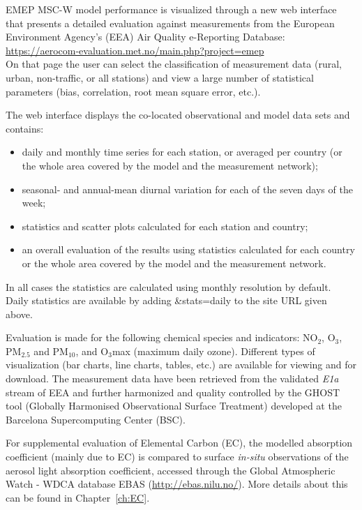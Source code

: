 EMEP MSC-W model performance is visualized through a new web
interface that presents a detailed evaluation against measurements from
the European Environment Agency's (EEA) Air Quality e-Reporting Database:\\
\url{https://aerocom-evaluation.met.no/main.php?project=emep}\\
On that page the user can select the classification of measurement data
(rural, urban, non-traffic, or all stations) and view a large number of
statistical parameters (bias, correlation, root mean square error, etc.).

The web interface displays the co-located observational and model data sets
and contains:
\begin{itemize}

\item daily and monthly time series for each station, or averaged per
  country (or the whole area covered by the model and the measurement network);
\item seasonal- and annual-mean diurnal variation for each of the seven days of the week;
\item statistics and scatter plots calculated for each station and country;
\item an overall evaluation of the results using statistics calculated for
  each country or the whole area covered by the model and the measurement network.
\end{itemize}
In all cases the statistics are calculated using monthly resolution
by default. Daily statistics are available by adding \&stats=daily to the
site URL given above.

Evaluation is made for the following chemical species and indicators:
NO$_{2}$, O$_{3}$, PM$_{2.5}$ and PM$_{10}$, and O$_{3}$max (maximum daily
ozone).
Different types of visualization (bar charts, line charts, tables,
etc.) are available for viewing and for download. The measurement data
have been retrieved from the validated {\em E1a} stream of EEA and further
harmonized and quality controlled by the GHOST tool (Globally Harmonised
Observational Surface Treatment) developed at the Barcelona Supercomputing
Center (BSC).

For supplemental evaluation of Elemental Carbon (EC), the modelled
absorption coefficient (mainly due to EC) is compared to surface \textit{in-situ}
observations of the aerosol light absorption coefficient, accessed through
the Global Atmospheric Watch - WDCA database EBAS
(\url{http://ebas.nilu.no/}). More details about this can be found in Chapter~\ref{ch:EC}.

